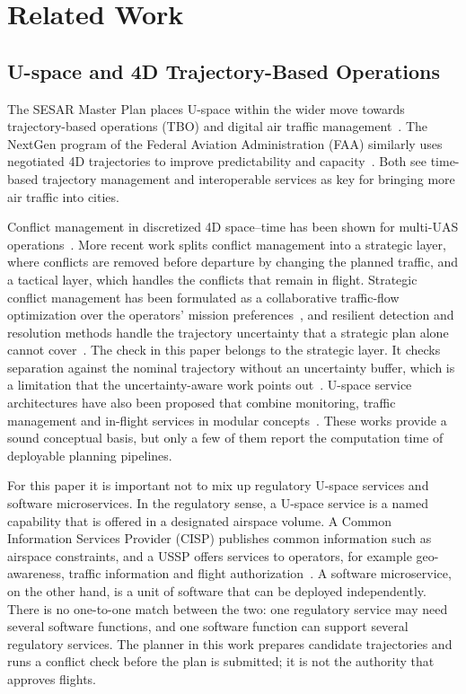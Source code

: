 \section{Related Work}
\label{sec:related}

\subsection{U-space and 4D Trajectory-Based Operations}

The SESAR Master Plan places U-space within the wider move towards trajectory-based operations (TBO) and digital air traffic management~\cite{sesar_master_plan_2025}. The NextGen program of the Federal Aviation Administration (FAA) similarly uses negotiated 4D trajectories to improve predictability and capacity~\cite{enea_porretta_4d_tbo_comparison}. Both see time-based trajectory management and interoperable services as key for bringing more air traffic into cities.

Conflict management in discretized 4D space--time has been shown for multi-UAS operations~\cite{acevedo_4d_grids_u_space}. More recent work splits conflict management into a strategic layer, where conflicts are removed before departure by changing the planned traffic, and a tactical layer, which handles the conflicts that remain in flight. Strategic conflict management has been formulated as a collaborative traffic-flow optimization over the operators' mission preferences~\cite{du2025_collaborative_uam_flow}, and resilient detection and resolution methods handle the trajectory uncertainty that a strategic plan alone cannot cover~\cite{badea2025_resilient_cdr}. The check in this paper belongs to the strategic layer. It checks separation against the nominal trajectory without an uncertainty buffer, which is a limitation that the uncertainty-aware work points out~\cite{badea2025_resilient_cdr}. U-space service architectures have also been proposed that combine monitoring, traffic management and in-flight services in modular concepts~\cite{uspace_inflight_services_architecture}. These works provide a sound conceptual basis, but only a few of them report the computation time of deployable planning pipelines.

For this paper it is important not to mix up regulatory U-space services and software microservices. In the regulatory sense, a U-space service is a named capability that is offered in a designated airspace volume. A Common Information Services Provider (CISP) publishes common information such as airspace constraints, and a USSP offers services to operators, for example geo-awareness, traffic information and flight authorization~\cite{easa2020uspace}. A software microservice, on the other hand, is a unit of software that can be deployed independently. There is no one-to-one match between the two: one regulatory service may need several software functions, and one software function can support several regulatory services. The planner in this work prepares candidate trajectories and runs a conflict check before the plan is submitted; it is not the authority that approves flights.

